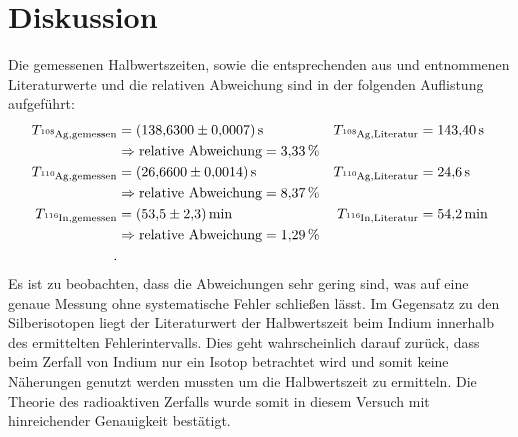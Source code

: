 \section{Diskussion}
\label{sec:Diskussion}
Die gemessenen Halbwertszeiten, sowie die entsprechenden aus \cite{In} und \cite{Ag} entnommenen Literaturwerte und
die relativen Abweichung sind in der folgenden Auflistung aufgeführt:
\begin{align*}
  T_{\ce{^{108}Ag},\text{gemessen}} &= \SI{138.63 \pm 0.0007}{\second} &   T_{\ce{^{108}Ag},\text{Literatur}} &= \SI{143.40}{\second} \\
  & \Rightarrow \text{relative Abweichung} = \SI{3.33}{\percent} \\
  T_{\ce{^{110}Ag},\text{gemessen}} &= \SI{26.66 \pm 0.0014}{\second}  &   T_{\ce{^{110}Ag},\text{Literatur}} &= \SI{24.6}{\second} \\
  & \Rightarrow \text{relative Abweichung} = \SI{8.37}{\percent} \\
  T_{\ce{^{116}In},\text{gemessen}} &= \SI{53.5 \pm 2.3}{\minute}  &   T_{\ce{^{116}In},\text{Literatur}} &= \SI{54.2}{\minute} \\
  & \Rightarrow \text{relative Abweichung} = \SI{1.29}{\percent} \\ .
\end{align*}
Es ist zu beobachten, dass die Abweichungen sehr gering sind, was auf eine genaue Messung ohne systematische Fehler schließen lässt.
Im Gegensatz zu den Silberisotopen liegt der Literaturwert der Halbwertszeit beim Indium innerhalb des ermittelten Fehlerintervalls.
Dies geht wahrscheinlich darauf zurück, dass beim Zerfall von Indium nur ein Isotop betrachtet wird und somit keine Näherungen genutzt
werden mussten um die Halbwertszeit zu ermitteln.
Die Theorie des radioaktiven Zerfalls wurde somit in diesem Versuch mit hinreichender Genauigkeit bestätigt.
